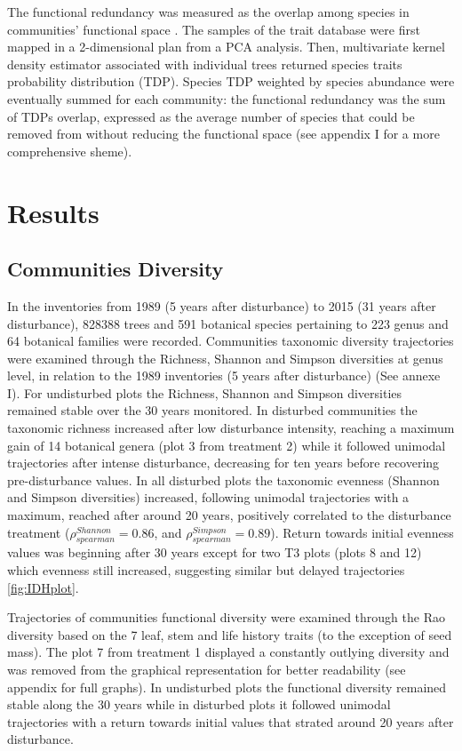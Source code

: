 \documentclass[fleqn,10pt]{ArtEcoFoG} %
\theoremstyle{definition}
\theoremstyle{definition}
\theoremstyle{definition}
\theoremstyle{remark}
\begin{document}
The functional redundancy was measured as the overlap among species in
communities' functional space \citep{Carmona2016}. The samples of the
trait database were first mapped in a 2-dimensional plan from a PCA
analysis. Then, multivariate kernel density estimator associated with
individual trees returned species traits probability distribution (TDP).
Species TDP weighted by species abundance were eventually summed for
each community: the functional redundancy was the sum of TDPs overlap,
expressed as the average number of species that could be removed from
without reducing the functional space (see appendix I for a more
comprehensive sheme).

\section{Results}\label{results}

\subsection{Communities Diversity}\label{communities-diversity}

In the inventories from 1989 (5 years after disturbance) to 2015 (31
years after disturbance), 828388 trees and 591 botanical species
pertaining to 223 genus and 64 botanical families were recorded.
Communities taxonomic diversity trajectories were examined through the
Richness, Shannon and Simpson diversities at genus level, in relation to
the 1989 inventories (5 years after disturbance) (See annexe I). For
undisturbed plots the Richness, Shannon and Simpson diversities remained
stable over the 30 years monitored. In disturbed communities the
taxonomic richness increased after low disturbance intensity, reaching a
maximum gain of 14 botanical genera (plot 3 from treatment 2) while it
followed unimodal trajectories after intense disturbance, decreasing for
ten years before recovering pre-disturbance values. In all disturbed
plots the taxonomic evenness (Shannon and Simpson diversities)
increased, following unimodal trajectories with a maximum, reached after
around 20 years, positively correlated to the disturbance treatment
(\(\rho_{spearman}^{Shannon}=0.86\), and
\(\rho_{spearman}^{Simpson}=0.89\)). Return towards initial evenness
values was beginning after 30 years except for two T3 plots (plots 8 and
12) which evenness still increased, suggesting similar but delayed
trajectories \ref{fig:IDHplot}.

Trajectories of communities functional diversity were examined through
the Rao diversity based on the 7 leaf, stem and life history traits (to
the exception of seed mass). The plot 7 from treatment 1 displayed a
constantly outlying diversity and was removed from the graphical
representation for better readability (see appendix for full graphs). In
undisturbed plots the functional diversity remained stable along the 30
years while in disturbed plots it followed unimodal trajectories with a
return towards initial values that strated around 20 years after
disturbance.
\end{document}
